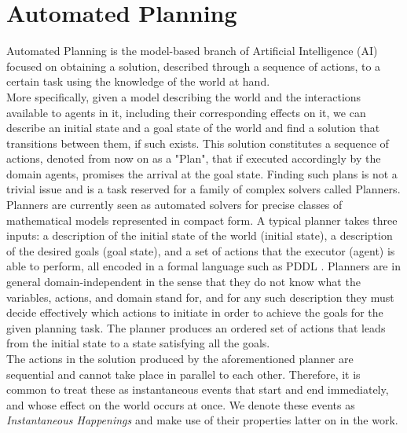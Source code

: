 \section{Automated Planning}
\label{background: automated}
Automated Planning is the model-based branch of Artificial Intelligence (AI) focused on obtaining a solution, described through
 a sequence of actions, to a certain task using the knowledge of the world at hand.\\
More specifically, given a model describing the world and the interactions available to agents in it, including their 
corresponding effects on it, we can describe an initial state and a goal state of the world and find a solution that 
transitions between them, if such exists. This solution constitutes a sequence of actions, denoted from now on as a "Plan", 
that if executed accordingly by the domain agents, promises the arrival at the goal state. Finding such plans is not a trivial 
issue and is a task reserved for a family of complex solvers called Planners.\\
Planners are currently seen as automated solvers for precise classes of mathematical models represented in compact form. A typical 
planner takes three inputs: a description of the initial state of the world (initial state), a description of the desired goals (goal state),
 and a set of actions that the executor (agent) is able to perform, all encoded in a formal language such as PDDL \cite{PDDL}. 
Planners are in  general domain-independent in the sense that they do not know what the variables, actions, and domain stand for,
and for any such description they must decide effectively which actions to initiate in order to achieve the goals for the given 
planning task. The planner produces an ordered set of actions that leads from the initial state to a state satisfying all the goals.
\\ 
The actions in the solution produced by the aforementioned planner are sequential and cannot take place in parallel to each other. 
Therefore, it is common to treat these as instantaneous events that start and end immediately, and whose effect on the world occurs at once.
We denote these events as \emph{Instantaneous Happenings} and make use of their properties latter on in the work.

